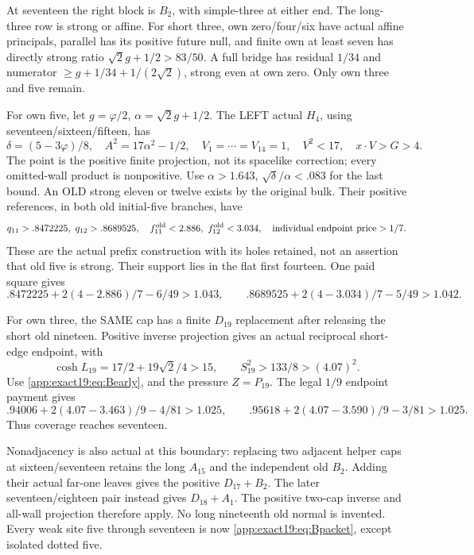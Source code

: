 At seventeen the right block is
\(B_2\), with simple-three at either
end.
The long-three row is strong or
affine.
For short three, own zero/four/six
have actual affine principals,
parallel has its positive future
null, and finite own at least seven
has directly strong ratio
\(\sqrt2g+1/2>83/50\).
A full bridge has residual \(1/34\)
and numerator
\(\ge g+1/34+1/(2\sqrt2)\), strong
even at own zero.
Only own three and five remain.

For own five, let \(g=\varphi/2\),
\(\alpha=\sqrt2g+1/2\).
The LEFT actual \(H_4\), using
seventeen/sixteen/fifteen, has
\[
 \delta=(5-3\varphi)/8,\quad A^2=17\alpha^2-1/2,
 \quad V_1=\cdots=V_{14}=1,\quad V^2<17,
                    \quad x\cdot V>G>4 .
\]
The point is the positive finite
projection, not its spacelike
correction; every omitted-wall
product is nonpositive.
Use \(\alpha>1.643\),
\(\sqrt\delta/\alpha<.083\)
for the last bound.
An OLD strong eleven or twelve
exists by the original bulk.
Their positive references, in both
old initial-five branches, have
\[
 q_{11}>.8472225,\ q_{12}>.8689525,\quad
 f_{11}^{\rm old}<2.886,\ f_{12}^{\rm old}<3.034,
                    \quad\text{individual endpoint price}>1/7 .
\]
These are the actual prefix
construction with its holes retained,
not an assertion that old five is
strong.
Their support lies in the flat
first fourteen.
One paid square gives
\[
 .8472225+2(4-2.886)/7-6/49>1.043,\qquad
 .8689525+2(4-3.034)/7-5/49>1.042 .
\]

For own three, the SAME cap has a
finite \(D_{19}\) replacement after
releasing the short old nineteen.
Positive inverse projection gives
an actual reciprocal short-edge
endpoint, with
\[
 \cosh L_{19}=17/2+19\sqrt2/4>15,\qquad
               S_{19}^2>133/8>(4.07)^2 .
\]
Use \eqref{app:exact19:eq:Bearly},
and the pressure \(Z=P_{19}\).
The legal \(1/9\) endpoint payment
gives
\[
 .94006+2(4.07-3.463)/9-4/81>1.025,\qquad
 .95618+2(4.07-3.590)/9-3/81>1.025 .
\]
Thus coverage reaches seventeen.

Nonadjacency is also actual at this
boundary: replacing two adjacent
helper caps at sixteen/seventeen
retains the long \(A_{15}\) and
the independent old \(B_2\).
Adding their actual far-one leaves
gives the positive \(D_{17}+B_2\).
The later seventeen/eighteen pair
instead gives \(D_{18}+A_1\).
The positive two-cap inverse and
all-wall projection therefore apply.
No long nineteenth old normal is
invented.
Every weak site five through
seventeen is now
\eqref{app:exact19:eq:Bpacket},
except isolated dotted five.

